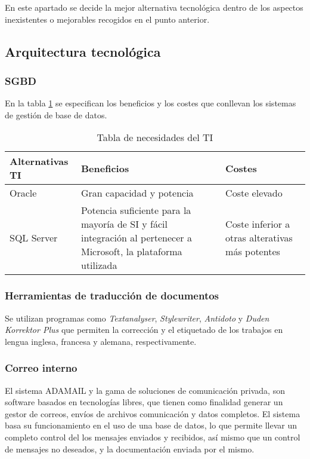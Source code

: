 \documentclass[11pt,a4paper,spanish,twoside]{book}
\begin{document}
En este apartado se decide la mejor alternativa tecnológica
dentro de los aspectos inexistentes o mejorables recogidos en el punto
anterior.

\subsection{Arquitectura tecnológica} \label{ss:7.2.1}
\subsubsection{SGBD}
En la tabla \ref{Tab:TabNecTI} se especifican los beneficios y los costes que
conllevan los sistemas de gestión de base de datos.
\begin{table}[!h]
\centering
  \begin{tabular}{p{3cm}p{4.7cm}p{2.3cm}}
    \textbf{Alternativas TI} & \textbf{Beneficios} &
    \textbf{Costes} \\
    \hline \hline
    Oracle\cite{ora} & Gran capacidad y potencia & Coste elevado\\ \hline
    SQL Server\cite{sql} & Potencia suficiente para la mayoría de SI y fácil
    integración al pertenecer a Microsoft, la plataforma utilizada & Coste
    inferior a otras alterativas más potentes\\ \hline
  \end{tabular}
\caption{Tabla de necesidades del TI} \label{Tab:TabNecTI}
\end{table}

\subsubsection{Herramientas de traducción de documentos}
Se utilizan programas como \emph{Textanalyser}, \emph{Stylewriter},
\emph{Antidoto} y \emph{Duden Korrektor Plus} que permiten la corrección y el
etiquetado de los trabajos en lengua inglesa, francesa y alemana,
respectivamente\cite{tra}. 

\subsubsection{Correo interno}
El sistema ADAMAIL\cite{ada} y la gama de soluciones de comunicación privada,
son software basados en tecnologías libres, que tienen como finalidad generar un
gestor de correos, envíos de archivos comunicación y datos completos. El
sistema basa su funcionamiento en el uso de una base de datos, lo que permite
llevar un completo control del los mensajes enviados y recibidos, así mismo
que un control de mensajes no deseados, y la documentación enviada por el
mismo. 
\end{document}

